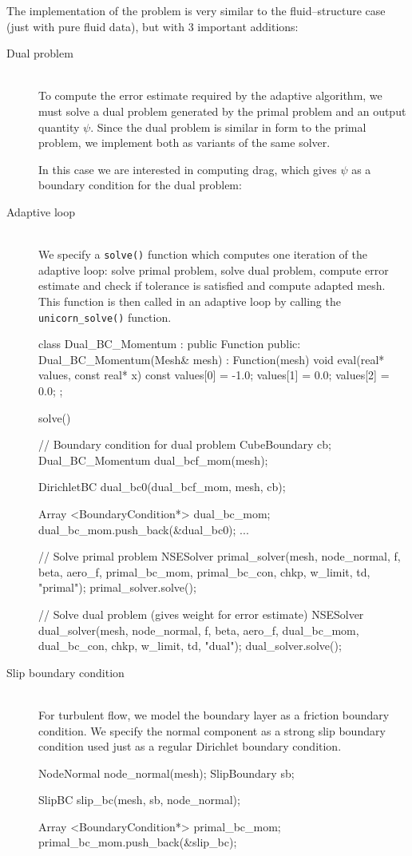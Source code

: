 The implementation of the problem is
very similar to the fluid--structure case (just with pure fluid data),
but with 3 important additions:
\begin{description}
\item[Dual problem] \ \\ To compute the error estimate required by the
  adaptive algorithm, we must solve a dual problem generated by the
  primal problem and an output quantity $\psi$. Since the dual problem
  is similar in form to the primal problem, we implement both as
  variants of the same solver.

In this case we are interested in computing drag, which gives $\psi$
as a boundary condition for the dual problem:

\item[Adaptive loop] \ \\ We specify a {\tt solve()} function which computes one
  iteration of the adaptive loop: solve primal problem, solve dual
  problem, compute error estimate and check if tolerance is satisfied
  and compute adapted mesh. This function is then called in an
  adaptive loop by calling the {\tt unicorn\_solve()} function.

\begin{c++}
class Dual_BC_Momentum : public Function
{
public:
  Dual_BC_Momentum(Mesh& mesh) : Function(mesh) {}
  void eval(real* values, const real* x) const
  {
    values[0] = -1.0;
    values[1] = 0.0;
    values[2] = 0.0;
  }
};

solve()
{
  // Boundary condition for dual problem
  CubeBoundary cb;
  Dual_BC_Momentum dual_bcf_mom(mesh);

  DirichletBC dual_bc0(dual_bcf_mom, mesh, cb);

  Array <BoundaryCondition*> dual_bc_mom;
  dual_bc_mom.push_back(&dual_bc0);
  ...


  // Solve primal problem
  NSESolver primal_solver(mesh, node_normal, f, beta, aero_f, primal_bc_mom, primal_bc_con,
    chkp, w_limit, td, "primal");
  primal_solver.solve();

  // Solve dual problem (gives weight for error estimate)
  NSESolver dual_solver(mesh, node_normal, f, beta, aero_f, dual_bc_mom, dual_bc_con,
    chkp, w_limit, td, "dual");
  dual_solver.solve();
}

\end{c++}

\item[Slip boundary condition] \ \\ For turbulent flow, we model the
  boundary layer as a friction boundary condition. We specify the
  normal component as a strong slip boundary condition used just as a
  regular Dirichlet boundary condition.
\begin{c++}
NodeNormal node_normal(mesh);
SlipBoundary sb;

SlipBC slip_bc(mesh, sb, node_normal);

Array <BoundaryCondition*> primal_bc_mom;
primal_bc_mom.push_back(&slip_bc);
\end{c++}

\end{description}


